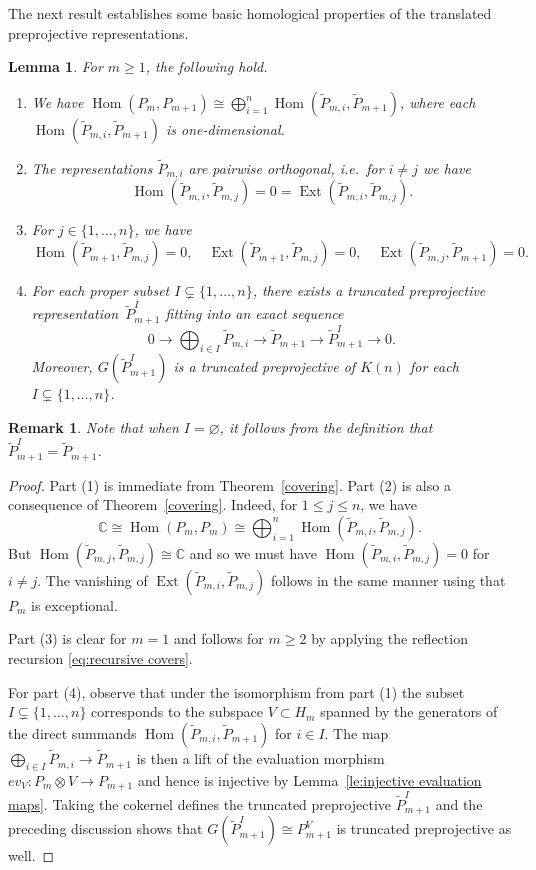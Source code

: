 \documentclass{amsart}
\newtheorem{lemma}[theorem]{Lemma}
\newtheorem{remark}[theorem]{Remark}
\numberwithin{equation}{section}
\newcommand{\CC}{\mathbb{C}}
\newcommand{\Ext}{\operatorname{Ext}}
\newcommand{\Hom}{\operatorname{Hom}}
\newcommand{\ses}[3]{0\rightarrow #1\rightarrow #2\rightarrow#3\rightarrow 0}
\begin{document}
The next result establishes some basic homological properties of the translated preprojective representations.
\begin{lemma}
  \label{le:homdecomposition}
  For $m\geq 1$, the following hold.
  \begin{enumerate}
    \item We have $\Hom(P_m,P_{m+1})\cong\bigoplus\limits_{i=1}^n \Hom(\tilde P_{m,i},\tilde P_{m+1})$, where each $\Hom(\tilde P_{m,i},\tilde P_{m+1})$ is one-dimensional.
    \item The representations $\tilde P_{m,i}$ are pairwise orthogonal, i.e.\ for $i\neq j$ we have 
      \[\Hom(\tilde P_{m,i},\tilde P_{m,j})=0=\Ext(\tilde P_{m,i},\tilde P_{m,j}).\]
    \item For $j\in\{1,\ldots,n\}$, we have
      \[\Hom(\tilde P_{m+1},\tilde P_{m,j})=0,\quad\Ext(\tilde P_{m+1},\tilde P_{m,j})=0,\quad\Ext(\tilde P_{m,j},\tilde P_{m+1})=0.\]
    \item For each proper subset $I\subsetneq\{1,\ldots,n\}$, there exists a truncated preprojective representation~$\tilde P_{m+1}^I$ fitting into an exact sequence 
      \begin{equation}
        \label{ses1}
        \ses{\bigoplus_{i\in I} \tilde P_{m,i}}{\tilde P_{m+1}}{\tilde P_{m+1}^I}.
      \end{equation}
      Moreover, $G(\tilde P_{m+1}^I)$ is a truncated preprojective of $K(n)$ for each $I\subsetneq\{1,\ldots,n\}$.
  \end{enumerate}
\end{lemma}
\begin{remark}
  Note that when $I=\varnothing$, it follows from the definition that $\tilde P_{m+1}^I=\tilde P_{m+1}$.
\end{remark}
\begin{proof}
  Part (1) is immediate from Theorem~\ref{covering}.
  Part (2) is also a consequence of Theorem~\ref{covering}.
  Indeed, for $1\leq j\leq n$, we have 
  $$\CC\cong\Hom(P_m,P_m)\cong\bigoplus_{i=1}^n \Hom(\tilde P_{m,i},\tilde P_{m,j}).$$
  But $\Hom(\tilde P_{m,j},\tilde P_{m,j})\cong\CC$ and so we must have $\Hom(\tilde P_{m,i},\tilde P_{m,j})=0$ for $i\neq j$.
  The vanishing of $\Ext(\tilde P_{m,i},\tilde P_{m,j})$ follows in the same manner using that $P_m$ is exceptional.

  Part (3) is clear for $m=1$ and follows for $m\ge2$ by applying the reflection recursion \eqref{eq:recursive covers}.

  For part (4), observe that under the isomorphism from part (1) the subset $I\subsetneq\{1,\ldots,n\}$ corresponds to the subspace $V\subset H_m$ spanned by the generators of the direct summands $\Hom(\tilde P_{m,i},\tilde P_{m+1})$ for $i\in I$.
  The map $\bigoplus_{i\in I} \tilde P_{m,i}\to\tilde P_{m+1}$ is then a lift of the evaluation morphism $ev_V:P_m\otimes V\to P_{m+1}$ and hence is injective by Lemma~\ref{le:injective evaluation maps}.
  Taking the cokernel defines the truncated preprojective $\tilde P_{m+1}^I$ and the preceding discussion shows that $G(\tilde P_{m+1}^I)\cong P_{m+1}^V$ is truncated preprojective as well.
\end{proof}
\end{document}
